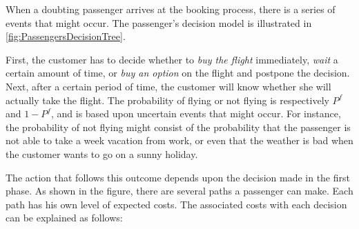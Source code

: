 When a doubting passenger arrives at the booking process, there is a series of events that might occur. The passenger's decision model is illustrated in \autoref{fig:PassengersDecisionTree}.


First, the customer has to decide whether to \emph{buy the flight} immediately, \emph{wait} a certain amount of time, or \emph{buy an option} on the flight and postpone the decision. Next, after a certain period of time, the customer will know whether she will actually take the flight. The probability of flying or not flying is respectively $P^f$ and $1 - P^f$, and is based upon uncertain events that might occur. For instance, the probability of not flying might consist of the probability that the passenger is not able to take a week vacation from work, or even that the weather is bad when the customer wants to go on a sunny holiday.

The action that follows this outcome depends upon the decision made in the first phase. As shown in the figure, there are several paths a passenger can make. Each path has his own level of expected costs. The associated costs with each decision can be explained as follows:

